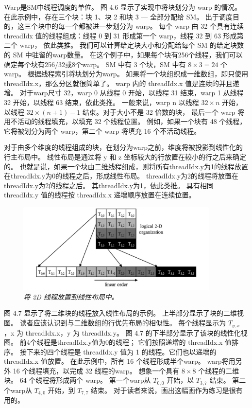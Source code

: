 Warp是SM中线程调度的单位。 图 4.6 显示了实现中将块划分为 warp 的情况。 
在此示例中，存在三个块：块 1、块 2 和块 3 — 全部分配给 SM。 出于调度目的，这三个块中的每一个都被进一步划分为 warp。 
每个 warp 由 32 个具有连续 threadIdx 值的线程组成：线程 0 到 31 形成第一个 warp，线程 32 到 63 形成第二个 warp，
依此类推。 我们可以计算给定块大小和分配给每个 SM 的给定块数的 SM 中驻留的warp数量。 
在这个例子中，如果每个块有256个线程，我们可以确定每个块有256/32或8个warp。 
SM 中有 3 个块，SM 中有 $8 \times 3 = 24$ 个warp。 根据线程索引将块划分为warp。 
如果将一个块组织成一维数组，即只使用threadIdx.x，那么分区就很简单了。 warp 内的 threadIdx.x 值是连续的并且递增。 
对于warp尺寸 32，warp 0 从线程 0 开始，以线程 31 结束，warp 1 从线程 32 开始，以线程 63 结束，依此类推。 
一般来说，warp n 以线程 $32 \times n$ 开始，以线程 $32 \times (n+1) - 1$ 结束。对于大小不是 32 倍数的块，
最后一个 warp 将用不活动的线程填充，以填充 32 个线程位置。 
例如，如果一个块有 48 个线程，它将被划分为两个 warp，第二个 warp 将填充 16 个不活动线程。

对于由多个维度的线程组成的块，在划分为warp之前，维度将被投影到线性化的行主布局中。 
线性布局是通过将 y 和 z 坐标较大的行放置在较小的行之后来确定的。 
也就是说，如果一个块由二维线程组成，则将所有threadIdx.y为1的线程放置在threadIdx.y为0的线程之后，形成线性布局。
threadIdx.y为2的线程将放置在threadIdx.y为2的线程之后。 其threadIdx.y为1，依此类推。 
具有相同 threadIdx.y 值的线程按 threadIdx.x 递增顺序放置在连续位置。

\begin{figure}[H]
	\centering
	\includegraphics[width=0.9\textwidth]{figs/F4.7.png}
	\caption{\textit{将 2D 线程放置到线性布局中。}}
\end{figure}

图 4.7 显示了将二维块的线程放入线性布局的示例。 上半部分显示了块的二维视图。 
读者应该认识到与二维数组的行优先布局的相似性。 每个线程显示为 $T_{y,x}$ ，x 为 threadIdx.x，y 为 threadIdx.y。 
图 4.7 的下半部分显示了该块的线性化视图。 前4个线程是threadIdx.y值为0的线程； 它们按照递增的 threadIdx.x 值排序。 
接下来的四个线程是 threadIdx.y 值为 1 的线程。它们也以递增的 threadIdx.x 值放置。 
在此示例中，所有 16 个线程形成半个warp。 warp将用另外 16 个线程填充，以完成 32 线程的warp。 
想象一个具有 $8 \times 8$ 个线程的二维块。 64 个线程将形成两个 warp。 
第一个warp从 $T_{0,0}$ 开始，以 $T_{3,7}$ 结束。 
第二个warp从 $T_{4,0}$ 开始，到 $T_{7,7}$ 结束。 对于读者来说，画出这幅画作为练习是很有用的。

